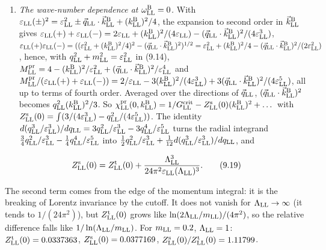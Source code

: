 \documentclass[
  10pt,
]{article}
\providecommand{\tightlist}{%
  \setlength{\itemsep}{0pt}\setlength{\parskip}{0pt}}
\begin{document}
\begin{enumerate}
\def\labelenumi{(\roman{enumi})}
\setcounter{enumi}{2}
\tightlist
\item
  \emph{The wave-number dependence at \(\omega^{\rm B}_{\rm LL}=0\).}
  With
  \(\varepsilon_{\rm LL}(\pm)^2=\varepsilon_{\rm LL}^2\pm\vec q_{\rm LL}\cdot\vec k^{\rm B}_{\rm LL}+(k^{\rm B}_{\rm LL})^2/4\),
  the expansion to second order in \(\vec k^{\rm B}_{\rm LL}\) gives
  \(\varepsilon_{\rm LL}(+)+\varepsilon_{\rm LL}(-)=2\varepsilon_{\rm LL}+(k^{\rm B}_{\rm LL})^2/(4\varepsilon_{\rm LL})-(\vec q_{\rm LL}\cdot\vec k^{\rm B}_{\rm LL})^2/(4\varepsilon_{\rm LL}^3)\),
  \(\varepsilon_{\rm LL}(+)\varepsilon_{\rm LL}(-)=((\varepsilon_{\rm LL}^2+(k^{\rm B}_{\rm LL})^2/4)^2-(\vec q_{\rm LL}\cdot\vec k^{\rm B}_{\rm LL})^2)^{1/2}=\varepsilon_{\rm LL}^2+(k^{\rm B}_{\rm LL})^2/4-(\vec q_{\rm LL}\cdot\vec k^{\rm B}_{\rm LL})^2/(2\varepsilon_{\rm LL}^2)\),
  hence, with \(q_{\rm LL}^2+m_{\rm LL}^2=\varepsilon_{\rm LL}^2\) in
  (9.14),
  \(M^{\rm pr}_{\rm LL}=4-(k^{\rm B}_{\rm LL})^2/\varepsilon_{\rm LL}^2+(\vec q_{\rm LL}\cdot\vec k^{\rm B}_{\rm LL})^2/\varepsilon_{\rm LL}^4\)
  and
  \(M^{\rm pr}_{\rm LL}/(\varepsilon_{\rm LL}(+)+\varepsilon_{\rm LL}(-))=2/\varepsilon_{\rm LL}-3(k^{\rm B}_{\rm LL})^2/(4\varepsilon_{\rm LL}^3)+3(\vec q_{\rm LL}\cdot\vec k^{\rm B}_{\rm LL})^2/(4\varepsilon_{\rm LL}^5)\),
  all up to terms of fourth order. Averaged over the directions of
  \(\vec q_{\rm LL}\),
  \((\vec q_{\rm LL}\cdot\vec k^{\rm B}_{\rm LL})^2\) becomes
  \(q_{\rm LL}^2(k^{\rm B}_{\rm LL})^2/3\). So
  \(\chi^{\rm pr}_{\rm LL}(0,k^{\rm B}_{\rm LL})=1/G^{\rm crit}_{\rm LL}-Z^{\rm s}_{\rm LL}(0)(k^{\rm B}_{\rm LL})^2+\dots\)
  with
  \(Z^{\rm s}_{\rm LL}(0)=\int(3/(4\varepsilon_{\rm LL}^3)-q_{\rm LL}^2/(4\varepsilon_{\rm LL}^5))\).
  The identity
  \(d(q_{\rm LL}^3/\varepsilon_{\rm LL}^3)/dq_{\rm LL}=3q_{\rm LL}^2/\varepsilon_{\rm LL}^3-3q_{\rm LL}^4/\varepsilon_{\rm LL}^5\)
  turns the radial integrand
  \(\tfrac34q_{\rm LL}^2/\varepsilon_{\rm LL}^3-\tfrac14q_{\rm LL}^4/\varepsilon_{\rm LL}^5\)
  into
  \(\tfrac12q_{\rm LL}^2/\varepsilon_{\rm LL}^3+\tfrac1{12}d(q_{\rm LL}^3/\varepsilon_{\rm LL}^3)/dq_{\rm LL}\),
  and
\end{enumerate}

\[Z^{\rm s}_{\rm LL}(0)=Z^{\rm t}_{\rm LL}(0)+\frac{\Lambda_{\rm LL}^3}{24\pi^2\varepsilon_{\rm LL}(\Lambda_{\rm LL})^3}.\tag{9.19}\]

The second term comes from the edge of the momentum integral: it is the
breaking of Lorentz invariance by the cutoff. It does not vanish for
\(\Lambda_{\rm LL}\to\infty\) (it tends to \(1/(24\pi^2)\)), but
\(Z^{\rm t}_{\rm LL}(0)\) grows like
\(\ln(2\Lambda_{\rm LL}/m_{\rm LL})/(4\pi^2)\), so the relative
difference falls like \(1/\ln(\Lambda_{\rm LL}/m_{\rm LL})\). For
\(m_{\rm LL}=0.2\), \(\Lambda_{\rm LL}=1\):
\(Z^{\rm t}_{\rm LL}(0)=0.0337363\),
\(Z^{\rm s}_{\rm LL}(0)=0.0377169\),
\(Z^{\rm s}_{\rm LL}(0)/Z^{\rm t}_{\rm LL}(0)=1.11799\).
\end{document}
